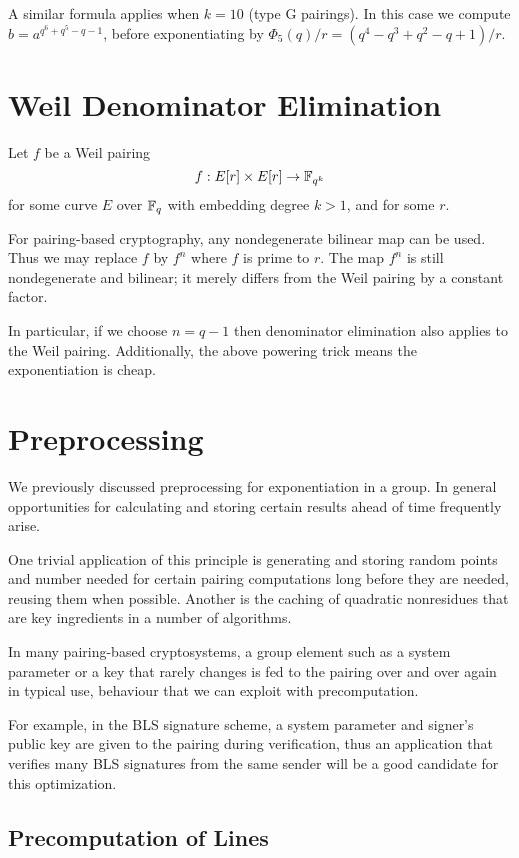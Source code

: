 A similar formula applies when $k=10$ (type G pairings).
In this case we compute $b = a^{q^6 + q^5 - q - 1}$, before
exponentiating by $\Phi_5(q) / r = (q^4 - q^3 + q^2 - q + 1)/r$.

\section {Weil Denominator Elimination}

Let $f$ be a Weil pairing
\[ f:E[r] \times E[r] \rightarrow \mathbb{F}_{q^k} \]
for some curve $E$ over $\mathbb{F}_q$ with embedding degree $k > 1$, and for some
$r$.

For pairing-based cryptography, any nondegenerate bilinear map can be used.
Thus we may replace $f$ by $f^n$ where $f$ is prime to $r$.
The map $f^n$ is still nondegenerate and bilinear; it merely differs from the
Weil pairing by a constant factor.

In particular, if we choose $n = q - 1$ then denominator elimination
also applies to the Weil pairing. Additionally, the above powering trick
means the exponentiation is cheap.

\section {Preprocessing}

We previously discussed preprocessing for exponentiation in a group.
In general opportunities for calculating and storing
certain results ahead of time frequently arise.

One trivial application of this principle
is generating and storing random points and number needed for certain pairing
computations long before they are needed, reusing them when possible.
Another is the caching of quadratic nonresidues that are key
ingredients in a number of algorithms.

In many pairing-based cryptosystems, a group element such as a system parameter
or a key that rarely changes is fed to the pairing over and over again in
typical use, behaviour that we can exploit with precomputation.

For example, in the BLS signature scheme, a system parameter and
signer's public key are given to the pairing during verification, thus
an application that verifies many BLS signatures from the same sender will be a
good candidate for this optimization.

\subsection {Precomputation of Lines}

